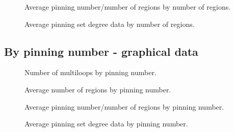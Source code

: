 \documentclass{article}%
\begin{document}
\begin{multicols}{2}
\begin{figure}[H]
\centering
\scalebox{0.6}{}
\caption{Average pinning number/number of regions by number of regions.}
\label{fig:tex/img/numRegionsAvgsPercentages.pgf}
\end{figure}
\columnbreak

\begin{figure}[H]
\centering
\scalebox{0.6}{}
\caption{Average pinning set degree data by number of regions.}
\label{fig:tex/img/numRegionsGonalities.pgf}
\end{figure}
\end{multicols}



\newpage

\subsection{By pinning number - graphical data}
\label{sec:byPinningGraph}

\begin{multicols}{2}
\begin{figure}[H]
\centering
\scalebox{0.6}{}
\caption{Number of multiloops by pinning number.}
\label{fig:tex/img/pinNumsNumloops.pgf}
\end{figure}
\columnbreak

\begin{figure}[H]
\centering
\scalebox{0.6}{}
\caption{Average number of regions by pinning number.}
\label{fig:tex/img/pinNumsAvgsRegions.pgf}
\end{figure}
\end{multicols}

\begin{multicols}{2}
\begin{figure}[H]
\centering
\scalebox{0.6}{}
\caption{Average pinning number/number of regions by pinning number.}
\label{fig:tex/img/pinNumsAvgsPercentages.pgf}
\end{figure}
\columnbreak

\begin{figure}[H]
\centering
\scalebox{0.6}{}
\caption{Average pinning set degree data by pinning number.}
\label{fig:tex/img/pinNumsGonalities.pgf}
\end{figure}
\end{multicols}
\end{document}

